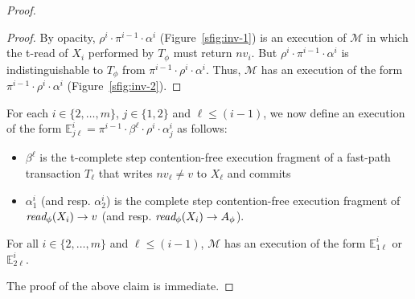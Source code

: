 \begin{proof}
\begin{proof}
By opacity, $\rho^i\cdot \pi^{i-1} \cdot \alpha^i$ (Figure~\ref{sfig:inv-1}) is an execution
of $\mathcal{M}$ in which the t-read of $X_i$ performed by $T_{\phi}$ must return $nv_i$.
But $\rho^i \cdot \pi^{i-1} \cdot \alpha^i$ is indistinguishable to $T_{\phi}$ from
$\pi^{i-1}\cdot \rho^i \cdot \alpha^i$.
Thus, $\mathcal{M}$ has an execution of the form $\pi^{i-1}\cdot \rho^i \cdot \alpha^i$ (Figure~\ref{sfig:inv-2}).
\end{proof}
%
For each $i\in \{2,\ldots, m\}$, $j\in \{1,2\}$ and $\ell \leq (i-1)$, 
we now define an execution of the form  $\mathbb{E}_{j\ell}^{i}=\pi^{i-1}\cdot \beta^{\ell}\cdot \rho^i \cdot \alpha_j^i$
as follows:
%
\begin{itemize}
\item
$\beta^{\ell}$ is the t-complete step contention-free execution fragment of a fast-path transaction $T_{\ell}$
that writes $nv_{\ell}\neq v$ to $X_{\ell}$ and commits
\item
$\alpha_1^i$ (and resp. $\alpha_2^i$) is the complete step contention-free execution fragment of 
$\textit{read}_{\phi}(X_i) \rightarrow v$ (and resp. $\textit{read}_{\phi}(X_i) \rightarrow A_{\phi}$).
\end{itemize}
%
\begin{claim}
\label{cl:ic2}
For all $i\in \{2,\ldots, m\}$ and $\ell \leq (i-1)$, $\mathcal{M}$ has an execution of the form $\mathbb{E}_{1\ell}^{i}$ or 
$\mathbb{E}_{2\ell}^{i}$.
\end{claim}
%
The proof of the above claim is immediate.
% 
% 

\end{proof}
